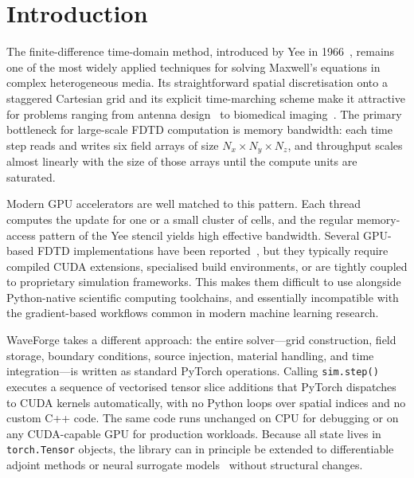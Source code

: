 \documentclass[10pt,twocolumn]{article}
\begin{document}
\section{Introduction}
\label{sec:intro}

The finite-difference time-domain method, introduced by Yee in
1966~\cite{yee1966numerical}, remains one of the most widely applied techniques
for solving Maxwell's equations in complex heterogeneous media. Its
straightforward spatial discretisation onto a staggered Cartesian grid and its
explicit time-marching scheme make it attractive for problems ranging from
antenna design~\cite{taflove2005computational} to biomedical
imaging~\cite{hagness1997three,fear2002breast}. The primary bottleneck for
large-scale FDTD computation is memory bandwidth: each time step reads and
writes six field arrays of size $N_x \times N_y \times N_z$, and throughput
scales almost linearly with the size of those arrays until the compute units
are saturated.

Modern GPU accelerators are well matched to this pattern. Each thread
computes the update for one or a small cluster of cells, and the regular
memory-access pattern of the Yee stencil yields high effective bandwidth.
Several GPU-based FDTD implementations have been
reported~\cite{chen2020gpu,winter2015fdtd}, but they typically require
compiled CUDA extensions, specialised build environments, or are tightly
coupled to proprietary simulation frameworks. This makes them difficult to
use alongside Python-native scientific computing toolchains, and essentially
incompatible with the gradient-based workflows common in modern machine
learning research.

WaveForge takes a different approach: the entire solver—grid construction,
field storage, boundary conditions, source injection, material handling, and
time integration—is written as standard PyTorch operations. Calling
\texttt{sim.step()} executes a sequence of vectorised tensor slice additions
that PyTorch dispatches to CUDA kernels automatically, with no Python loops
over spatial indices and no custom C++ code. The same code runs unchanged on
CPU for debugging or on any CUDA-capable GPU for production workloads. Because
all state lives in \texttt{torch.Tensor} objects, the library can in principle
be extended to differentiable adjoint methods or neural surrogate
models~\cite{thankane2021deeplearning} without structural changes.
\end{document}
